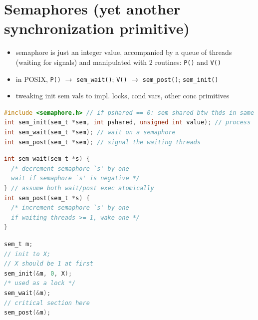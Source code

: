 \section*{Semaphores (yet another synchronization primitive)}
\begin{itemize}
\item semaphore is just an integer value, accompanied by a queue of threads (waiting for signals) and manipulated with 2 routines: \texttt{P()} and \texttt{V()}
\item in POSIX, \texttt{P()} $\to$ \texttt{sem\_wait()}; \texttt{V()} $\to$ \texttt{sem\_post()};  \texttt{sem\_init()}
\item tweaking init sem vals to impl. locks, cond vars, other conc primitives
\end{itemize}
\begin{lstlisting}[language=c]
#include <semaphore.h> // if pshared == 0: sem shared btw thds in same
int sem_init(sem_t *sem, int pshared, unsigned int value); // process
int sem_wait(sem_t *sem); // wait on a semaphore
int sem_post(sem_t *sem); // signal the waiting threads
\end{lstlisting}
\begin{minipage}{0.6\linewidth}
\begin{lstlisting}[language=c]
int sem_wait(sem_t *s) {
  /* decrement semaphore `s' by one
  wait if semaphore `s' is negative */
} // assume both wait/post exec atomically
int sem_post(sem_t *s) {
  /* increment semaphore `s' by one
  if waiting threads >= 1, wake one */
}
\end{lstlisting}
\end{minipage}
\begin{minipage}{0.4\linewidth}
\begin{lstlisting}[language=c,xleftmargin=2pt,xrightmargin=2pt]
sem_t m;
// init to X;
// X should be 1 at first
sem_init(&m, 0, X);
/* used as a lock */
sem_wait(&m);
// critical section here
sem_post(&m);
\end{lstlisting}
\end{minipage}
